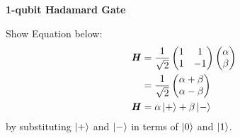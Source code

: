 \documentclass[a4paper, 10pt]{article}
\begin{document}
\begin{problem}
\textbf{1-qubit Hadamard Gate}
\par Show Equation below:
\begin{align*}
	\textbf{\textit{H}} & = \frac{1}{\sqrt{2}} \begin{pmatrix} 1 & 1 \\ 1 & -1 \end{pmatrix} \begin{pmatrix} \alpha \\ \beta \end{pmatrix} \\
	                    & = \frac{1}{\sqrt{2}} \begin{pmatrix} \alpha + \beta \\ \alpha - \beta \end{pmatrix}                              \\
	\textbf{\textit{H}} & = \alpha \ket{+} + \beta \ket{-}
\end{align*}
by substituting \( \ket{+} \) and \( \ket{-} \) in terms of \( \ket{0} \) and \( \ket{1} \).
\end{problem}
\end{document}
